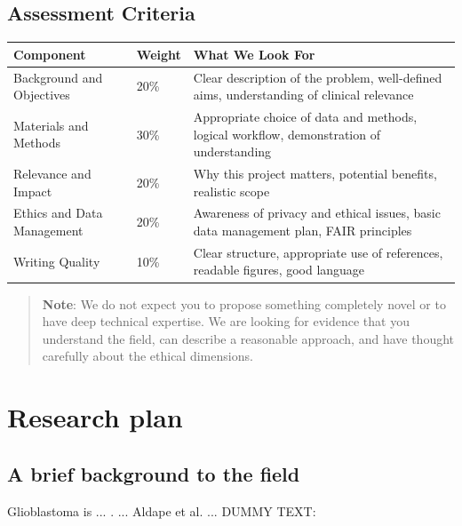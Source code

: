 \documentclass[11pt]{article}
\begin{document}
\begin{scriptsize}
\subsection*{Assessment Criteria}
\begin{table}[htbp]
\centering
\scriptsize
\begin{tabular}{p{4.5cm}p{1.5cm}p{8cm}}
\toprule
\textbf{Component} & \textbf{Weight} & \textbf{What We Look For} \\
\midrule
Background and Objectives & 20\% & Clear description of the problem, well-defined aims, understanding of clinical relevance \\
Materials and Methods & 30\% & Appropriate choice of data and methods, logical workflow, demonstration of understanding \\
Relevance and Impact & 20\% & Why this project matters, potential benefits, realistic scope \\
Ethics and Data Management & 20\% & Awareness of privacy and ethical issues, basic data management plan, FAIR principles \\
Writing Quality & 10\% & Clear structure, appropriate use of references, readable figures, good language \\
\bottomrule
\end{tabular}
\end{table}
\begin{quote}
\textbf{Note}: We do not expect you to propose something completely novel or to have deep technical expertise. We are looking for evidence that you understand the field, can describe a reasonable approach, and have thought carefully about the ethical dimensions.
\end{quote}
\end{scriptsize}

\vspace{3mm}
\section{Research plan} %

\vspace{3mm}

\subsection{A brief background to the field}

Glioblastoma is ...  \cite{Louis2021}. ...  Aldape et al. \cite{Aldape2019} ... 
DUMMY TEXT:
\lipsum[5]
\end{document}

